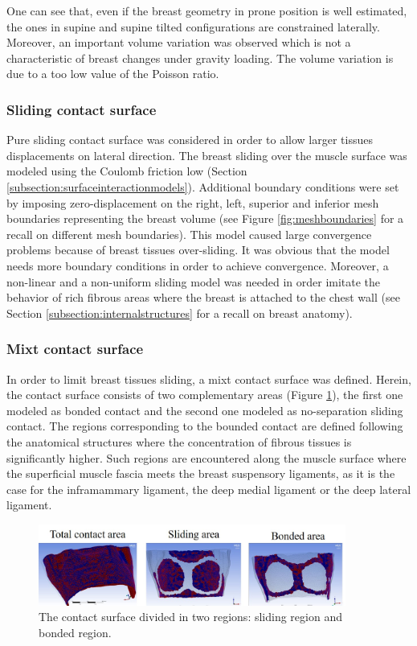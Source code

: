 One can see that, even if the breast geometry in prone position is well estimated, the ones in supine and supine tilted configurations are constrained laterally. Moreover, an important volume variation was observed which is not a characteristic of breast changes under gravity loading. The volume variation is due to a too low value of the Poisson ratio. 

\subsubsection*{Sliding contact surface}

Pure sliding contact surface was considered in order to allow larger tissues displacements on lateral direction. The breast sliding over the muscle surface was modeled using the Coulomb friction low (Section \ref{subsection:surfaceinteractionmodels}). Additional boundary conditions were set by imposing zero-displacement on the right, left, superior and inferior mesh boundaries representing the breast volume (see Figure \ref{fig:meshboundaries} for a recall on different mesh boundaries).  This model caused large convergence problems because of breast tissues over-sliding. It was obvious that the model needs more boundary conditions in order to achieve convergence. Moreover, a non-linear and a non-uniform sliding model was needed in order imitate the behavior of rich fibrous areas where the breast is attached to the chest wall (see Section \ref{subsection:internalstructures} for a recall on breast anatomy). 


\subsubsection*{Mixt contact surface}

In order to limit breast tissues sliding, a mixt contact surface was defined. Herein, the contact surface consists of two complementary areas (Figure \ref{fig:mixtcontact}), the first one modeled as bonded contact and the second one modeled as no-separation sliding contact. The regions corresponding to the bounded contact are defined following the anatomical structures where the concentration of fibrous tissues is significantly higher. Such regions are encountered along the muscle surface where the superficial muscle fascia meets the breast suspensory ligaments, as it is the case for the inframammary ligament, the deep medial ligament or the deep lateral ligament.

\begin{figure}[!h]
\centering
\includegraphics[width=0.9\textwidth,keepaspectratio]{figures/mixtcontactarea.jpg} 
\caption{The contact surface divided in two regions: sliding region and bonded region.}
\label{fig:mixtcontact}
\end{figure}

